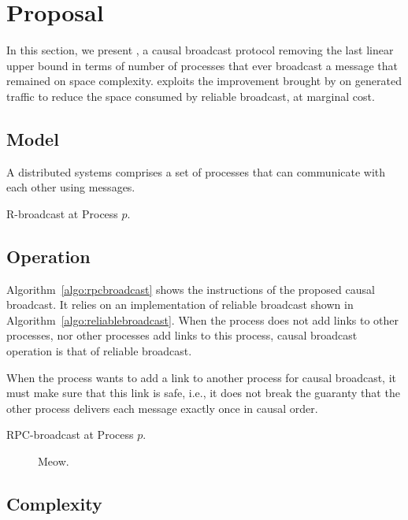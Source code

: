
\section{Proposal}
\label{sec:proposal}

In this section, we present \RPCBROADCAST, a causal broadcast protocol removing
the last linear upper bound in terms of number of processes that ever broadcast
a message that remained on space complexity. \RPCBROADCAST exploits the
improvement brought by \PCBROADCAST on generated traffic to reduce the space
consumed by reliable broadcast, at marginal cost.

\subsection{Model}

A distributed systems comprises a set of processes that can communicate with
each other using messages.


\begin{algorithm}[h]
  
  \caption{\label{algo:reliablebroadcast}R-broadcast at Process $p$.}
\end{algorithm}

\subsection{Operation}

Algorithm~\ref{algo:rpcbroadcast} shows the instructions of the proposed causal
broadcast. It relies on an implementation of reliable broadcast shown in
Algorithm~\ref{algo:reliablebroadcast}. When the process does not add links to
other processes, nor other processes add links to this process, causal broadcast
operation is that of reliable broadcast.

When the process wants to add a link to another process for causal broadcast, it
must make sure that this link is safe, i.e., it does not break the guaranty that
the other process delivers each message exactly once in causal order.


\begin{algorithm}[h]
  
  \caption{\label{algo:rpcbroadcast}RPC-broadcast at Process $p$.}
\end{algorithm}


\begin{figure*}
  \begin{center}
    
    \caption{Meow.}
  \end{center}
\end{figure*}

\subsection{Complexity}


